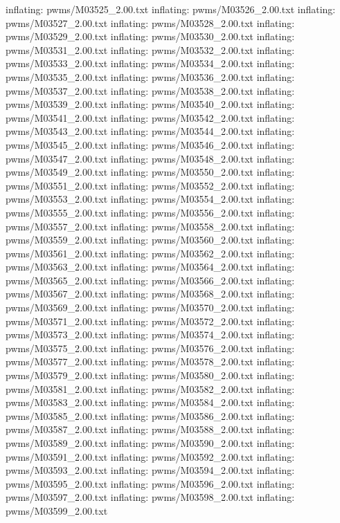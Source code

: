 \documentclass[letterpaper,10pt,english]{sphinxmanual}
\begin{document}
{\begin{sphinxVerbatim}[commandchars=\\\{\}]
  inflating: pwms/M03525\_2.00.txt
  inflating: pwms/M03526\_2.00.txt
  inflating: pwms/M03527\_2.00.txt
  inflating: pwms/M03528\_2.00.txt
  inflating: pwms/M03529\_2.00.txt
  inflating: pwms/M03530\_2.00.txt
  inflating: pwms/M03531\_2.00.txt
  inflating: pwms/M03532\_2.00.txt
  inflating: pwms/M03533\_2.00.txt
  inflating: pwms/M03534\_2.00.txt
  inflating: pwms/M03535\_2.00.txt
  inflating: pwms/M03536\_2.00.txt
  inflating: pwms/M03537\_2.00.txt
  inflating: pwms/M03538\_2.00.txt
  inflating: pwms/M03539\_2.00.txt
  inflating: pwms/M03540\_2.00.txt
  inflating: pwms/M03541\_2.00.txt
  inflating: pwms/M03542\_2.00.txt
  inflating: pwms/M03543\_2.00.txt
  inflating: pwms/M03544\_2.00.txt
  inflating: pwms/M03545\_2.00.txt
  inflating: pwms/M03546\_2.00.txt
  inflating: pwms/M03547\_2.00.txt
  inflating: pwms/M03548\_2.00.txt
  inflating: pwms/M03549\_2.00.txt
  inflating: pwms/M03550\_2.00.txt
  inflating: pwms/M03551\_2.00.txt
  inflating: pwms/M03552\_2.00.txt
  inflating: pwms/M03553\_2.00.txt
  inflating: pwms/M03554\_2.00.txt
  inflating: pwms/M03555\_2.00.txt
  inflating: pwms/M03556\_2.00.txt
  inflating: pwms/M03557\_2.00.txt
  inflating: pwms/M03558\_2.00.txt
  inflating: pwms/M03559\_2.00.txt
  inflating: pwms/M03560\_2.00.txt
  inflating: pwms/M03561\_2.00.txt
  inflating: pwms/M03562\_2.00.txt
  inflating: pwms/M03563\_2.00.txt
  inflating: pwms/M03564\_2.00.txt
  inflating: pwms/M03565\_2.00.txt
  inflating: pwms/M03566\_2.00.txt
  inflating: pwms/M03567\_2.00.txt
  inflating: pwms/M03568\_2.00.txt
  inflating: pwms/M03569\_2.00.txt
  inflating: pwms/M03570\_2.00.txt
  inflating: pwms/M03571\_2.00.txt
  inflating: pwms/M03572\_2.00.txt
  inflating: pwms/M03573\_2.00.txt
  inflating: pwms/M03574\_2.00.txt
  inflating: pwms/M03575\_2.00.txt
  inflating: pwms/M03576\_2.00.txt
  inflating: pwms/M03577\_2.00.txt
  inflating: pwms/M03578\_2.00.txt
  inflating: pwms/M03579\_2.00.txt
  inflating: pwms/M03580\_2.00.txt
  inflating: pwms/M03581\_2.00.txt
  inflating: pwms/M03582\_2.00.txt
  inflating: pwms/M03583\_2.00.txt
  inflating: pwms/M03584\_2.00.txt
  inflating: pwms/M03585\_2.00.txt
  inflating: pwms/M03586\_2.00.txt
  inflating: pwms/M03587\_2.00.txt
  inflating: pwms/M03588\_2.00.txt
  inflating: pwms/M03589\_2.00.txt
  inflating: pwms/M03590\_2.00.txt
  inflating: pwms/M03591\_2.00.txt
  inflating: pwms/M03592\_2.00.txt
  inflating: pwms/M03593\_2.00.txt
  inflating: pwms/M03594\_2.00.txt
  inflating: pwms/M03595\_2.00.txt
  inflating: pwms/M03596\_2.00.txt
  inflating: pwms/M03597\_2.00.txt
  inflating: pwms/M03598\_2.00.txt
  inflating: pwms/M03599\_2.00.txt

\end{sphinxVerbatim}}
\end{document}
